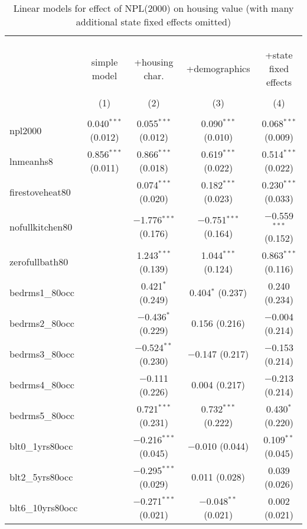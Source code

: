 \documentclass{article}
\begin{document}
\begin{table}[!htbp] \centering 
  \caption{Linear models for effect of NPL(2000) on housing value (with many additional state fixed effects omitted)} 
  \label{} 
\scriptsize 
\begin{tabular}{@{\extracolsep{5pt}}lcccc} 
\\[-1.8ex]\hline 
\hline \\[-1.8ex] 
\\[-1.8ex] & \multicolumn{4}{c}{ } \\ 
 & simple model & +housing char. & +demographics & +state fixed effects \\ 
\\[-1.8ex] & (1) & (2) & (3) & (4)\\ 
\hline \\[-1.8ex] 
 npl2000 & 0.040$^{***}$ (0.012) & 0.055$^{***}$ (0.012) & 0.090$^{***}$ (0.010) & 0.068$^{***}$ (0.009) \\ 
  lnmeanhs8 & 0.856$^{***}$ (0.011) & 0.866$^{***}$ (0.018) & 0.619$^{***}$ (0.022) & 0.514$^{***}$ (0.022) \\ 
  firestoveheat80 &  & 0.074$^{***}$ (0.020) & 0.182$^{***}$ (0.023) & 0.230$^{***}$ (0.033) \\ 
  nofullkitchen80 &  & $-$1.776$^{***}$ (0.176) & $-$0.751$^{***}$ (0.164) & $-$0.559$^{***}$ (0.152) \\ 
  zerofullbath80 &  & 1.243$^{***}$ (0.139) & 1.044$^{***}$ (0.124) & 0.863$^{***}$ (0.116) \\ 
  bedrms1\_80occ &  & 0.421$^{*}$ (0.249) & 0.404$^{*}$ (0.237) & 0.240 (0.234) \\ 
  bedrms2\_80occ &  & $-$0.436$^{*}$ (0.229) & 0.156 (0.216) & $-$0.004 (0.214) \\ 
  bedrms3\_80occ &  & $-$0.524$^{**}$ (0.230) & $-$0.147 (0.217) & $-$0.153 (0.214) \\ 
  bedrms4\_80occ &  & $-$0.111 (0.226) & 0.004 (0.217) & $-$0.213 (0.214) \\ 
  bedrms5\_80occ &  & 0.721$^{***}$ (0.231) & 0.732$^{***}$ (0.222) & 0.430$^{*}$ (0.220) \\ 
  blt0\_1yrs80occ &  & $-$0.216$^{***}$ (0.045) & $-$0.010 (0.044) & 0.109$^{**}$ (0.045) \\ 
  blt2\_5yrs80occ &  & $-$0.295$^{***}$ (0.029) & 0.011 (0.028) & 0.039 (0.026) \\ 
  blt6\_10yrs80occ &  & $-$0.271$^{***}$ (0.021) & $-$0.048$^{**}$ (0.021) & 0.002 (0.021) \\ 

\end{tabular}
\end{table}
\end{document}
